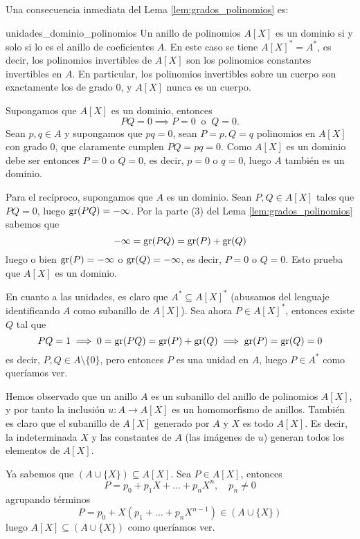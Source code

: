 Una consecuencia inmediata del Lema \ref{lem:grados_polinomios} es:

\begin{corollary}{}{unidades_dominio_polinomios}
Un anillo de polinomios \(A[X]\) es un dominio si y solo si lo es el anillo de coeficientes \(A\). En este caso se tiene \(A[X]^* = A^*\), es decir, los polinomios invertibles de \(A[X]\) son los polinomios constantes invertibles en \(A\). En particular, los polinomios invertibles sobre un cuerpo son exactamente los de grado 0, y \(A[X]\) nunca es un cuerpo.
\end{corollary}

\begin{proofbox}
Supongamos que \(A[X]\) es un dominio, entonces
\[
PQ = 0 \implies P = 0 ~\text{ o }~ Q = 0.
\]
Sean $p,q \in A$ y supongamos que $pq = 0$, sean $P = p, Q = q$ polinomios en $A[X]$ con grado 0, que claramente cumplen $PQ = pq = 0$. Como \(A[X]\) es un dominio debe ser entonces $P = 0$ o $Q = 0$, es decir, $p = 0$ o $q = 0$, luego \(A\) también es un dominio.

Para el recíproco, supongamos que \(A\) es un dominio. Sean $P,Q \in A[X]$ tales que $PQ = 0$, luego $\operatorname{gr}(PQ) = -\infty$. Por la parte (3) del Lema \ref{lem:grados_polinomios} sabemos que
\[
-\infty = \operatorname{gr}(PQ) = \operatorname{gr}(P) + \operatorname{gr}(Q)
\]
luego o bien \(\operatorname{gr}(P) = -\infty\) o \(\operatorname{gr}(Q) = - \infty\), es decir, $P = 0$ o $Q = 0$. Esto prueba que $A[X]$ es un dominio. 

En cuanto a las unidades, es claro que $A^* \subseteq A[X]^*$ (abusamos del lenguaje identificando $A$ como subanillo de $A[X]$). Sea ahora $P \in A[X]^*$, entonces existe $Q$ tal que
\[
PQ = 1 \implies 0 = \operatorname{gr}(PQ) = \operatorname{gr}(P) + \operatorname{gr}(Q) \implies \operatorname{gr}(P) = \operatorname{gr}(Q) = 0
\]
es decir, $P, Q \in A \setminus \{0\}$, pero entonces $P$ es una unidad en $A$, luego $P \in A^*$ como queríamos ver.
\end{proofbox}

Hemos observado que un anillo \(A\) es un subanillo del anillo de polinomios \(A[X]\), y por tanto la inclusión \(u : A \to A[X]\) es un homomorfismo de anillos. También es claro que el subanillo de \(A[X]\) generado por \(A\) y \(X\) es todo \(A[X]\). Es decir, la indeterminada \(X\) y las constantes de \(A\) (las imágenes de \(u\)) generan todos los elementos de \(A[X]\).

\begin{proofbox}
Ya sabemos que $(A \cup \{X\}) \subseteq A[X]$. Sea $P \in A[X]$, entonces
\[
P = p_0 + p_1 X + \dots + p_n X^n, \quad p_n \neq 0
\]
agrupando términos
\[
P = p_0 + X(p_1 + \dots + p_n X^{n-1}) \in (A \cup \{X\})
\]
luego $A[X] \subseteq (A \cup \{X\})$ como queríamos ver.
\end{proofbox}

